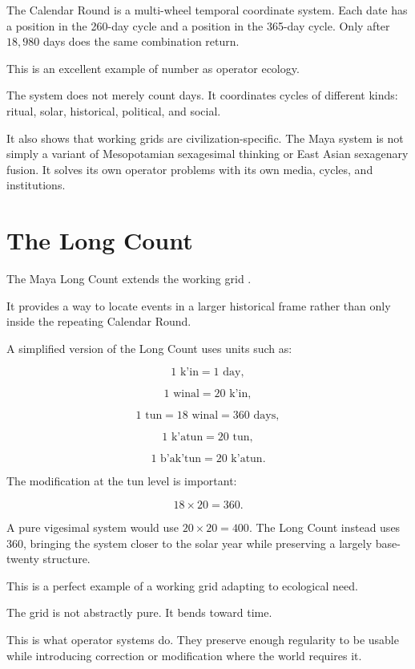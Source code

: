\documentclass[11pt]{book}
\begin{document}
The Calendar Round is a multi-wheel temporal coordinate system. Each date has a position in the 260-day cycle and a position in the 365-day cycle. Only after \(18{,}980\) days does the same combination return.

This is an excellent example of number as operator ecology.

The system does not merely count days. It coordinates cycles of different kinds: ritual, solar, historical, political, and social.

It also shows that working grids are civilization-specific. The Maya system is not simply a variant of Mesopotamian sexagesimal thinking or East Asian sexagenary fusion. It solves its own operator problems with its own media, cycles, and institutions.

\section{The Long Count}

The Maya Long Count extends the working grid \cite{BrickerBricker2011AstronomyMayaCodices,Thompson1950MayaHieroglyphicWriting,Coe2011Maya}.

It provides a way to locate events in a larger historical frame rather than only inside the repeating Calendar Round.

A simplified version of the Long Count uses units such as:

\[
1 \text{ k'in} = 1 \text{ day},
\]

\[
1 \text{ winal} = 20 \text{ k'in},
\]

\[
1 \text{ tun} = 18 \text{ winal} = 360 \text{ days},
\]

\[
1 \text{ k'atun} = 20 \text{ tun},
\]

\[
1 \text{ b'ak'tun} = 20 \text{ k'atun}.
\]

The modification at the tun level is important:

\[
18 \times 20 = 360.
\]

A pure vigesimal system would use \(20 \times 20 = 400\). The Long Count instead uses \(360\), bringing the system closer to the solar year while preserving a largely base-twenty structure.

This is a perfect example of a working grid adapting to ecological need.

The grid is not abstractly pure. It bends toward time.

This is what operator systems do. They preserve enough regularity to be usable while introducing correction or modification where the world requires it.
\end{document}
